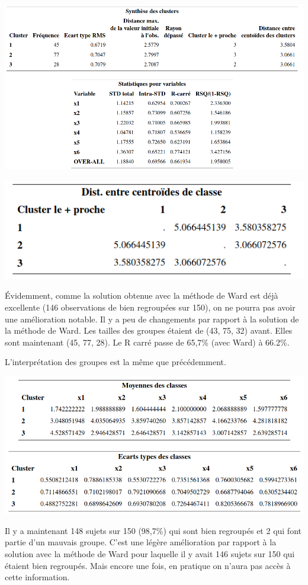 \documentclass[
  11pt,
  letterpaper,
]{book}
\theoremstyle{definition}
\theoremstyle{definition}
\theoremstyle{definition}
\theoremstyle{remark}
\begin{document}
\begin{center}\includegraphics[width=0.9\linewidth]{figures/04-clustering-e15} \end{center}

\begin{center}\includegraphics[width=0.5\linewidth]{figures/04-clustering-e16} \end{center}

Évidemment, comme la solution obtenue avec la méthode de Ward est déjà excellente (146 observations de bien regroupées sur 150), on ne pourra pas avoir une amélioration notable. Il y a peu de changements par rapport à la solution de la méthode de Ward. Les tailles des groupes étaient de (43, 75, 32) avant. Elles sont maintenant (45, 77, 28). Le R carré passe de 65,7\% (avec Ward) à 66.2\%.

L'interprétation des groupes est la même que précédemment.

\begin{center}\includegraphics[width=0.7\linewidth]{figures/04-clustering-e17} \end{center}

Il y a maintenant 148 sujets sur 150 (98,7\%) qui sont bien regroupés et 2 qui font partie d'un mauvais groupe. C'est une légère amélioration par rapport à la solution avec la méthode de Ward pour laquelle il y avait 146 sujets sur 150 qui étaient bien regroupés. Mais encore une fois, en pratique on n'aura pas accès à cette information.
\end{document}
